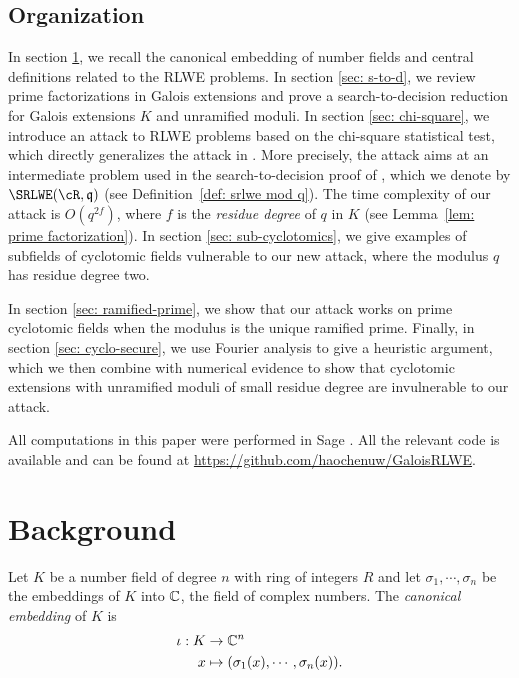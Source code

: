 \documentclass[envcountsame]{llncs}
\begin{document}
\subsection{Organization}

In section \ref{sec: background}, we recall the canonical embedding of number fields and central definitions related to the RLWE problems. In section \ref{sec: s-to-d}, we review prime factorizations in Galois extensions and prove a search-to-decision reduction for Galois extensions $K$ and unramified moduli. In section \ref{sec: chi-square}, we introduce an attack to RLWE problems based on the chi-square statistical test, which directly generalizes the attack in \cite{elos2015weak}. More precisely, the attack aims at an intermediate problem used in the search-to-decision proof of \cite{lyubashevsky2013ideal}, which we denote by $\SRLWE(\cR,\fq)$ (see Definition~\ref{def: srlwe mod q}). The time complexity of our attack is $O(q^{2f})$, where $f$ is the {\it residue degree} of $q$ in $K$ (see Lemma~\ref{lem: prime factorization}). In section \ref{sec: sub-cyclotomics}, we give examples of subfields of cyclotomic fields vulnerable to our new attack, where the modulus $q$ has residue degree two.

In section \ref{sec: ramified-prime}, we show that our attack works on prime cyclotomic fields when the modulus is the unique ramified prime. Finally, in section \ref{sec: cyclo-secure}, we use Fourier analysis to give a heuristic argument, which we then combine with numerical evidence to show that cyclotomic extensions with unramified moduli of small residue degree are invulnerable to our attack.

All computations in this paper were performed in Sage \cite{sage}. All the relevant code is available and  can be found at \url{https://github.com/haochenuw/GaloisRLWE}.


\section{Background} \label{sec: background}

Let $K$ be a number field of degree $n$ with ring of integers $R$ and let $\sigma_1, \cdots, \sigma_n$ be the embeddings of $K$ into $\mathbb{C}$, the field of complex numbers. The {\it canonical embedding} of $K$ is
\begin{align*}
    \iota: K &\to \mathbb{C}^n \\
     x & \mapsto (\sigma_1(x), \cdots, \sigma_n(x)).
\end{align*}
\end{document}
